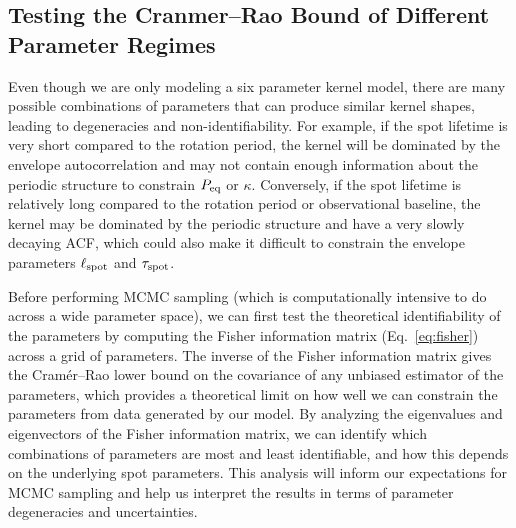 \documentclass[preprint]{aastex702}
\begin{document}
\subsection{Testing the Cranmer--Rao Bound of Different Parameter Regimes} \label{sec:cranmer_rao}

Even though we are only modeling a six parameter kernel model, there are many possible combinations of parameters that can produce similar kernel shapes, leading to degeneracies and non-identifiability. For example, if the spot lifetime is very short compared to the rotation period, the kernel will be dominated by the envelope autocorrelation and may not contain enough information about the periodic structure to constrain $P_{\rm eq}$ or $\kappa$. Conversely, if the spot lifetime is relatively long compared to the rotation period or observational baseline, the kernel may be dominated by the periodic structure and have a very slowly decaying ACF, which could also make it difficult to constrain the envelope parameters $\ell_{\rm spot}$ and $\tau_{\rm spot}$. 

Before performing MCMC sampling (which is computationally intensive to do across a wide parameter space), we can first test the theoretical identifiability of the parameters by computing the Fisher information matrix (Eq.~\ref{eq:fisher}) across a grid of parameters. The inverse of the Fisher information matrix gives the Cramér--Rao lower bound on the covariance of any unbiased estimator of the parameters, which provides a theoretical limit on how well we can constrain the parameters from data generated by our model. By analyzing the eigenvalues and eigenvectors of the Fisher information matrix, we can identify which combinations of parameters are most and least identifiable, and how this depends on the underlying spot parameters. This analysis will inform our expectations for MCMC sampling and help us interpret the results in terms of parameter degeneracies and uncertainties.
\end{document}
